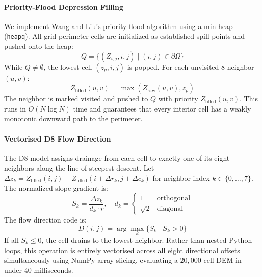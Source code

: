\documentclass[manuscript,screen,review]{acmart}
\begin{document}
\paragraph{Priority-Flood Depression Filling}
We implement Wang and Liu's priority-flood algorithm using a min-heap (\texttt{heapq}).
All grid perimeter cells are initialized as established spill points and pushed onto the heap:
\begin{equation}
  Q = \{ (Z_{i,j}, i, j) \mid (i, j) \in \partial \Omega \}
\end{equation}
While $Q \neq \emptyset$, the lowest cell $(z_p, i, j)$ is popped. For each unvisited 8-neighbor $(u, v)$:
\begin{equation}
  Z_{\text{filled}}(u, v) = \max(Z_{\text{raw}}(u, v), z_p)
\end{equation}
The neighbor is marked visited and pushed to $Q$ with priority $Z_{\text{filled}}(u, v)$.
This runs in $O(N \log N)$ time and guarantees that every interior cell has a weakly monotonic
downward path to the perimeter.

\paragraph{Vectorised D8 Flow Direction}
The D8 model assigns drainage from each cell to exactly one of its eight neighbors along the line
of steepest descent. Let $\Delta z_k = Z_{\text{filled}}(i, j) - Z_{\text{filled}}(i + \Delta r_k, j + \Delta c_k)$
for neighbor index $k \in \{0, \dots, 7\}$. The normalized slope gradient is:
\begin{equation}
  S_k = \frac{\Delta z_k}{d_k \cdot r}, \quad d_k = \begin{cases} 1 & \text{orthogonal} \\ \sqrt{2} & \text{diagonal} \end{cases}
\end{equation}
The flow direction code is:
\begin{equation}
  D(i, j) = \arg\max_{k} \{ S_k \mid S_k > 0 \}
\end{equation}
If all $S_k \le 0$, the cell drains to the lowest neighbor. Rather than nested Python loops,
this operation is entirely vectorised across all eight directional offsets simultaneously using
NumPy array slicing, evaluating a $20{,}000$-cell DEM in under 40 milliseconds.
\end{document}
